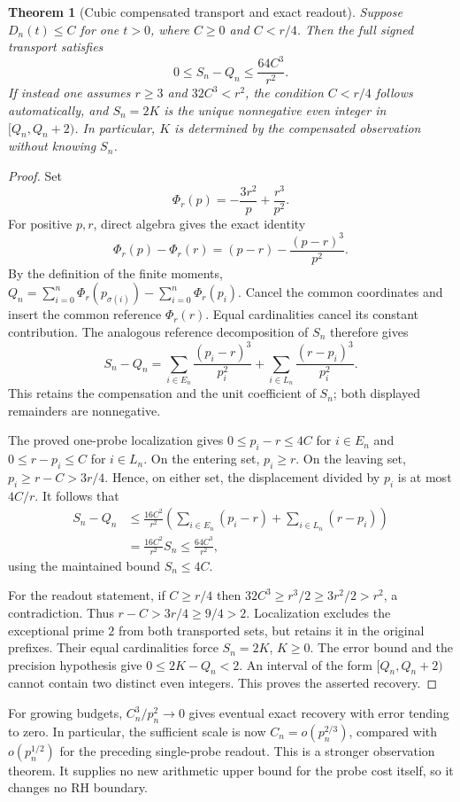 \documentclass[11pt]{article}
\newtheorem{theorem}{Theorem}[section]
\theoremstyle{definition}
\begin{document}
\begin{theorem}[Cubic compensated transport and exact readout]
Suppose $D_n(t)\le C$ for one $t>0$, where $C\ge0$ and $C<r/4$.
Then the full signed transport satisfies
\[
 0\le S_n-Q_n\le\frac{64C^3}{r^2}.
\]
If instead one assumes $r\ge3$ and $32C^3<r^2$, the condition $C<r/4$
follows automatically, and $S_n=2K$ is the unique nonnegative even
integer in $[Q_n,Q_n+2)$. In particular, $K$ is determined by the
compensated observation without knowing $S_n$.
\end{theorem}
\begin{proof}
Set
\[
 \Phi_r(p)=-\frac{3r^2}{p}+\frac{r^3}{p^2}.
\]
For positive $p,r$, direct algebra gives the exact identity
\[
 \Phi_r(p)-\Phi_r(r)
   =(p-r)-\frac{(p-r)^3}{p^2}.
\]
By the definition of the finite moments,
$Q_n=\sum_{i=0}^n\Phi_r(p_{\sigma(i)})
          -\sum_{i=0}^n\Phi_r(p_i)$.
Cancel the common coordinates and insert the common reference
$\Phi_r(r)$. Equal cardinalities cancel its constant contribution.
The analogous reference decomposition of $S_n$ therefore gives
\[
 S_n-Q_n=
 \sum_{i\in E_n}\frac{(p_i-r)^3}{p_i^2}
 +\sum_{i\in L_n}\frac{(r-p_i)^3}{p_i^2}.
\]
This retains the compensation and the unit coefficient of $S_n$;
both displayed remainders are nonnegative.

The proved one-probe localization gives
$0\le p_i-r\le4C$ for $i\in E_n$ and
$0\le r-p_i\le C$ for $i\in L_n$.
On the entering set, $p_i\ge r$. On the leaving set,
$p_i\ge r-C>3r/4$. Hence, on either set, the displacement divided
by $p_i$ is at most $4C/r$. It follows that
\[
\begin{split}
 S_n-Q_n
 &\le\frac{16C^2}{r^2}
    \left(\sum_{i\in E_n}(p_i-r)
          +\sum_{i\in L_n}(r-p_i)\right)\\
 &=\frac{16C^2}{r^2}S_n
 \le\frac{64C^3}{r^2},
\end{split}
\]
using the maintained bound $S_n\le4C$.

For the readout statement, if $C\ge r/4$ then
$32C^3\ge r^3/2\ge3r^2/2>r^2$, a contradiction.
Thus $r-C>3r/4\ge9/4>2$. Localization excludes the exceptional
prime $2$ from both transported sets, but retains it in the original
prefixes. Their equal cardinalities force $S_n=2K$, $K\ge0$.
The error bound and the precision hypothesis give
$0\le2K-Q_n<2$. An interval of the form $[Q_n,Q_n+2)$ cannot
contain two distinct even integers. This proves the asserted recovery.
\end{proof}

For growing budgets, $C_n^3/p_n^2\to0$ gives eventual exact recovery
with error tending to zero. In particular, the sufficient scale is now
$C_n=o(p_n^{2/3})$, compared with $o(p_n^{1/2})$ for the preceding
single-probe readout. This is a stronger observation theorem.
It supplies no new arithmetic upper bound for the probe cost itself,
so it changes no RH boundary.
\end{document}
